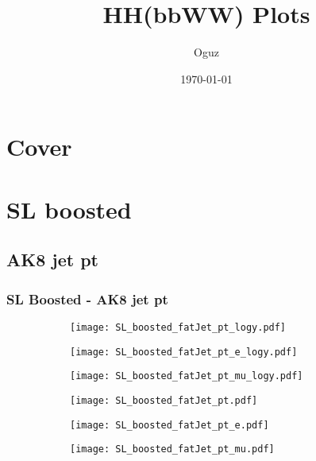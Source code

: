 \documentclass[aspectratio=169,8pt]{beamer}
\title{HH(bbWW) Plots}
\author{Oguz}
\institute{UCLouvain}
\date{\today}
\begin{document}
    \section{Cover}

    \frame{\titlepage}

\section{SL boosted}

\subsection{AK8 jet pt}
\begin{frame}
\frametitle{SL Boosted - AK8 jet pt}
\begin{figure}
\captionsetup[subfigure]{labelformat=empty}
\begin{subfigure}{0.32\textwidth}
\texttt{[image: SL\_boosted\_fatJet\_pt\_logy.pdf]}
\vspace*{-0.15cm}
\end{subfigure}
\hfil
\begin{subfigure}{0.32\textwidth}
\texttt{[image: SL\_boosted\_fatJet\_pt\_e\_logy.pdf]}
\vspace*{-0.15cm}
\end{subfigure}
\hfil
\begin{subfigure}{0.32\textwidth}
\texttt{[image: SL\_boosted\_fatJet\_pt\_mu\_logy.pdf]}
\vspace*{-0.15cm}
\end{subfigure}
\hfil
\begin{subfigure}{0.32\textwidth}
\texttt{[image: SL\_boosted\_fatJet\_pt.pdf]}
\vspace*{-0.15cm}
\end{subfigure}
\hfil
\begin{subfigure}{0.32\textwidth}
\texttt{[image: SL\_boosted\_fatJet\_pt\_e.pdf]}
\vspace*{-0.15cm}
\end{subfigure}
\hfil
\begin{subfigure}{0.32\textwidth}
\texttt{[image: SL\_boosted\_fatJet\_pt\_mu.pdf]}
\vspace*{-0.15cm}
\end{subfigure}
\hfil
\end{figure}
\end{frame}
\newpage
\end{document}
